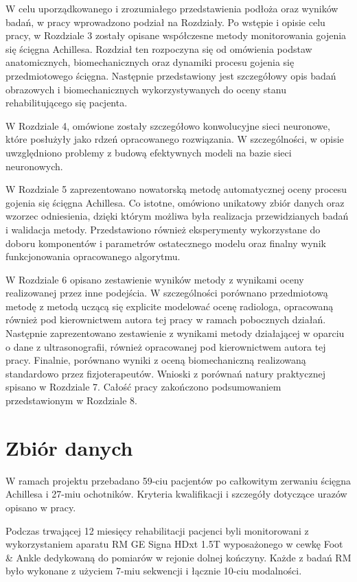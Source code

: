 W celu uporządkowanego i zrozumiałego przedstawienia podłoża oraz wyników badań, w pracy wprowadzono podział na Rozdziały. Po wstępie i opisie celu pracy, w Rozdziale 3 zostały opisane współczesne metody monitorowania gojenia się ścięgna Achillesa. Rozdział ten rozpoczyna się od omówienia podstaw anatomicznych, biomechanicznych oraz dynamiki procesu gojenia się przedmiotowego ścięgna. Następnie przedstawiony jest szczegółowy opis badań obrazowych i biomechanicznych wykorzystywanych do oceny stanu rehabilitującego się pacjenta. 

W Rozdziale 4, omówione zostały szczegółowo konwolucyjne sieci neuronowe, które posłużyły jako rdzeń opracowanego rozwiązania. W szczególności, w opisie uwzględniono problemy z budową efektywnych modeli na bazie sieci neuronowych. 

W Rozdziale 5 zaprezentowano nowatorską metodę automatycznej oceny procesu gojenia się ścięgna Achillesa. Co istotne, omówiono unikatowy zbiór danych oraz wzorzec odniesienia, dzięki którym możliwa była realizacja przewidzianych badań i walidacja metody. Przedstawiono również eksperymenty wykorzystane do doboru komponentów i parametrów ostatecznego modelu oraz finalny wynik funkcjonowania opracowanego algorytmu. 

W Rozdziale 6 opisano zestawienie wyników metody z wynikami oceny realizowanej przez inne podejścia. W szczególności porównano przedmiotową metodę z metodą uczącą się explicite modelować ocenę radiologa, opracowaną również pod kierownictwem autora tej pracy w ramach pobocznych działań. Następnie zaprezentowano zestawienie z wynikami metody działającej w oparciu o dane z ultrasonografii, również opracowanej pod kierownictwem autora tej pracy. Finalnie, porównano wyniki z oceną biomechaniczną realizowaną standardowo przez fizjoterapeutów. Wnioski z porównań natury praktycznej spisano w Rozdziale 7. Całość pracy zakończono podsumowaniem przedstawionym w Rozdziale 8.

{\let\clearpage\relax\chapter*{Zbiór danych}}

W ramach projektu przebadano 59-ciu pacjentów po całkowitym zerwaniu ścięgna Achillesa i 27-miu ochotników. Kryteria kwalifikacji i szczegóły dotyczące urazów opisano w pracy.

Podczas trwającej 12 miesięcy rehabilitacji pacjenci byli monitorowani z wykorzystaniem aparatu RM GE Signa HDxt 1.5T wyposażonego w cewkę Foot \& Ankle dedykowaną do pomiarów w rejonie dolnej kończyny. Każde z badań RM było wykonane z użyciem 7-miu sekwencji i łącznie 10-ciu modalności.

